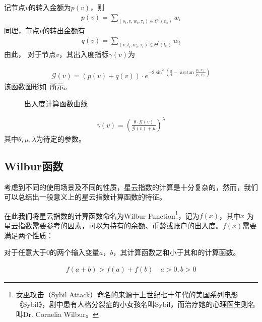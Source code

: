 
记节点$v$的转入金额为$p(v)$，则
\begin{align}
p(v) = \sum_{(s_i, v, w_i, \tau_i) \in \Theta^{\prime}(t_0)}{w_i}
\end{align}
\noindent 同理，节点$v$的转出金额有
\begin{align}
q(v) = \sum_{(v, t_i, w_i, \tau_i) \in \Theta^{\prime}(t_0)}{w_i}
\end{align}
\noindent 由此，
对于节点$v$，其出入度指标$\gamma(v)$为

\begin{align}
\mathcal{G}(v) = (p(v) + q(v)) \cdot e^{-2\sin^2{(\frac{\pi}{4} - \arctan\frac{q(v)}{p(v)})}}
\end{align}
\noindent 该函数图形如~所示。
\begin{figure}
  \centering
  
\caption{出入度计算函数曲线 \label{fig-surf}}
\end{figure}

\begin{align}
\gamma(v) = (\frac{\theta\cdot \mathcal{G}(v)}{\mathcal{G}(v) + \mu})^{\lambda}
\end{align}
\noindent 其中$\theta, \mu, \lambda$为待定的参数。


\subsection{Wilbur函数 \label{sec:function}}
考虑到不同的使用场景及不同的性质，星云指数的计算是十分复杂的，然而，我们可以总结出一般意义上的星云指数计算函数的特征。

在此我们将星云指数的计算函数命名为Wilbur Function\footnote{女巫攻击（Sybil Attack）命名的来源于上世纪七十年代的美国系列电影《Sybil》，剧中患有人格分裂症的小女孩名叫Sybil，而治疗她的心理医生则名叫Dr. Cornelia Wilbur。}，记为\(f(x)\)，其中\(x\)
为星云指数需要参考的因素，可以为持有的余额、币龄或账户的出入度。$f(x)$需要满足两个性质：

\begin{property}
\label{prop:one}
对于任意大于$0$的两个输入变量$a$，$b$，其计算函数之和小于其和的计算函数。
\end{property}

\begin{align}
f(a+b)>f(a)+f(b) \quad a>0,b>0
\end{align}

